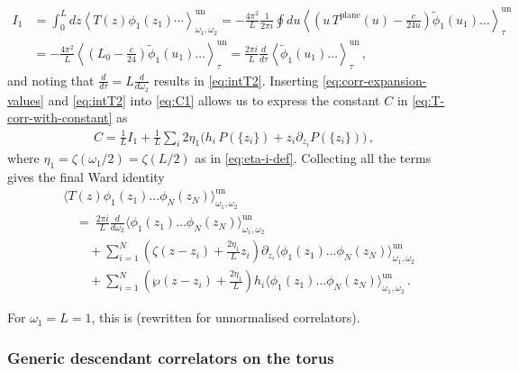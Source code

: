 \documentclass[11pt,a4paper]{article}
\numberwithin{equation}{section}
\begin{document}
%
\begin{align}
I_1 &= \int_0^L dz \left\langle T(z) \phi_1(z_1) \cdots \right\rangle_{\omega_1,\omega_2}^\mathrm{un} = -\frac{4\pi^2}{L} \frac{1}{2\pi i}\oint du\left\langle\left( u\, T^\text{plane}(u) - \frac{c}{24 u} \right) \tilde \phi_1(u_1) \dots\right\rangle_{\tau}^\mathrm{un}
\nonumber \\
&
= -\frac{4\pi^2}{L} \left\langle\left(L_0-\frac{c}{24}\right)\tilde \phi_1(u_1) \dots\right\rangle_{\tau}^\mathrm{un}
= \frac{2\pi i}{L} \frac{d}{d\tau} \left\langle \tilde \phi_1(u_1) \dots\right\rangle_{\tau}^\mathrm{un}
\,,
\end{align}
%
and noting that $\frac{d}{d\tau} = L \frac{d}{d\omega_2}$ results in \eqref{eq:intT2}.
Inserting \eqref{eq:corr-expansion-values} and \eqref{eq:intT2} into \eqref{eq:C1} allows us to express the constant $C$ in \eqref{eq:T-corr-with-constant} as
\begin{align}
 C = \frac1L I_1 + \frac1L \sum_{i} 2\eta_1 
 \Big( h_i \, P(\{z_i\}) +  z_i \partial_{z_i} P(\{z_i\}) \Big)\,,
\end{align}
where $\eta_1 = \zeta(\omega_1/2) = \zeta(L/2)$ as in \eqref{eq:eta-i-def}.
%
Collecting all the terms gives the final Ward identity
%
\begin{align}
     &\big\langle T(z) \phi_1(z_1) \dots \phi_N(z_N)\big\rangle_{\omega_1,\omega_2}^\mathrm{un} 
     \nonumber
     \\
     &\quad =~ 
     \frac{2\pi i}{L} \frac{d}{d\omega_2} \big\langle\phi_1(z_1) \dots \phi_N(z_N)\big\rangle_{\omega_1,\omega_2}^\mathrm{un}
     \nonumber \\
     &\qquad + \sum_{i=1}^N \left( \zeta(z-z_i)+ \frac{2\eta_1}{L} 
     z_i \right) \partial_{z_i} \big\langle\phi_1(z_1) \dots \phi_N(z_N)\big\rangle_{\omega_1,\omega_2}^\mathrm{un}
     \nonumber \\
     &\qquad + \sum_{i=1}^N\left(\wp(z-z_i)+\frac{2\eta_1}{L}
     \right) h_i \big\langle\phi_1(z_1) \dots \phi_N(z_N)\big\rangle_{\omega_1,\omega_2}^\mathrm{un}\,.
\end{align}

\noindent
For $\omega_1 = L = 1$, this is \cite[Eq.\,(28)]{Eguchi:1986sb} (rewritten for unnormalised correlators).

\subsubsection{Generic descendant correlators on the torus} \label{sec:torusDes}
\end{document}
